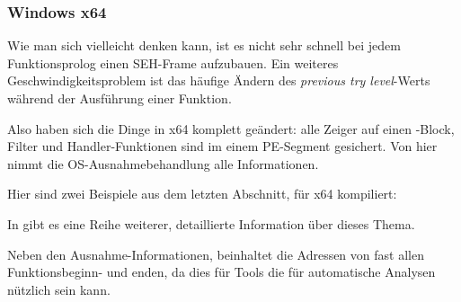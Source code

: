 \subsubsection{Windows x64}

\label{SEH_win64}

Wie man sich vielleicht denken kann, ist es nicht sehr schnell bei jedem Funktionsprolog
einen SEH-Frame aufzubauen.
Ein weiteres Geschwindigkeitsproblem ist das häufige Ändern des \emph{previous try level}-Werts
während der Ausführung einer Funktion.

Also haben sich die Dinge in x64 komplett geändert: alle Zeiger auf einen -Block,
Filter und Handler-Funktionen sind im einem PE-Segment  gesichert.
Von hier nimmt die \ac{OS}-Ausnahmebehandlung alle Informationen.

Hier sind zwei Beispiele aus dem letzten Abschnitt, für x64 kompiliert:





In \IgorSkochinsky gibt es eine Reihe weiterer, detaillierte Information über dieses Thema.

Neben den Ausnahme-Informationen, beinhaltet  die Adressen von fast allen
Funktionsbeginn- und enden, da dies für Tools die für automatische Analysen nützlich
sein kann.
